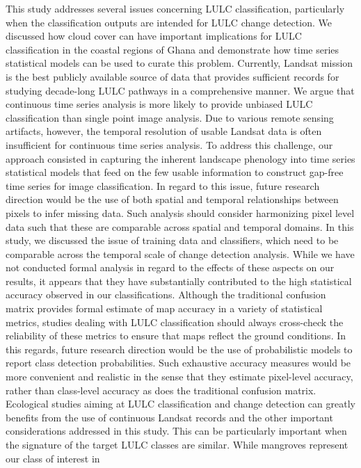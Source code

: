 \documentclass[12pt,oneside,preprint,3p,authoryear,times]{elsarticle} %
\begin{document}
This study addresses several issues concerning LULC classification,
particularly when the classification outputs are intended for LULC
change detection. We discussed how cloud cover can have important
implications for LULC classification in the coastal regions of Ghana and
demonstrate how time series statistical models can be used to curate
this problem. Currently, Landsat mission is the best publicly available
source of data that provides sufficient records for studying decade-long
LULC pathways in a comprehensive manner. We argue that continuous time
series analysis is more likely to provide unbiased LULC classification
than single point image analysis. Due to various remote sensing
artifacts, however, the temporal resolution of usable Landsat data is
often insufficient for continuous time series analysis. To address this
challenge, our approach consisted in capturing the inherent landscape
phenology into time series statistical models that feed on the few
usable information to construct gap-free time series for image
classification. In regard to this issue, future research direction would
be the use of both spatial and temporal relationships between pixels to
infer missing data. Such analysis should consider harmonizing pixel
level data such that these are comparable across spatial and temporal
domains. In this study, we discussed the issue of training data and
classifiers, which need to be comparable across the temporal scale of
change detection analysis. While we have not conducted formal analysis
in regard to the effects of these aspects on our results, it appears
that they have substantially contributed to the high statistical
accuracy observed in our classifications. Although the traditional
confusion matrix provides formal estimate of map accuracy in a variety
of statistical metrics, studies dealing with LULC classification should
always cross-check the reliability of these metrics to ensure that maps
reflect the ground conditions. In this regards, future research
direction would be the use of probabilistic models to report class
detection probabilities. Such exhaustive accuracy measures would be more
convenient and realistic in the sense that they estimate pixel-level
accuracy, rather than class-level accuracy as does the traditional
confusion matrix. Ecological studies aiming at LULC classification and
change detection can greatly benefits from the use of continuous Landsat
records and the other important considerations addressed in this study.
This can be particularly important when the signature of the target LULC
classes are similar. While mangroves represent our class of interest in
\end{document}
